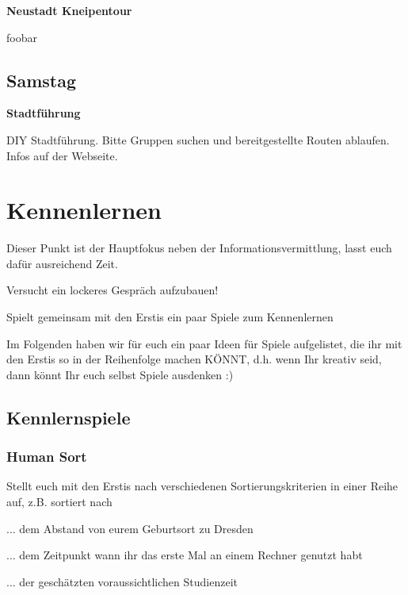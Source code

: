\documentclass[a4paper,12pt]{scrreprt}
\begin{document}
\textbf{Neustadt Kneipentour}
\begin{itemize*}
    \item foobar
\end{itemize*}


\subsection{Samstag}

\textbf{Stadtführung}
\begin{itemize*}
    \item DIY Stadtführung. Bitte Gruppen suchen und bereitgestellte Routen ablaufen. Infos auf der Webseite.
\end{itemize*}


\section{Kennenlernen}
\begin{itemize*}
    \item Dieser Punkt ist der Hauptfokus neben der Informationsvermittlung, lasst euch dafür ausreichend Zeit.
    \item Versucht ein lockeres Gespräch aufzubauen!
    \item Spielt gemeinsam mit den Erstis ein paar Spiele zum Kennenlernen
    \item Im Folgenden haben wir für euch ein paar Ideen für Spiele aufgelistet, die ihr mit den Erstis so in der Reihenfolge machen KÖNNT, d.h. wenn Ihr kreativ seid, dann könnt Ihr euch selbst Spiele ausdenken :)
\end{itemize*}


\subsection{Kennlernspiele}

\subsubsection{Human Sort}
\begin{itemize*}
    \item Stellt euch mit den Erstis nach verschiedenen Sortierungskriterien in einer Reihe auf, z.B. sortiert nach
    \item ... dem Abstand von eurem Geburtsort zu Dresden
    \item ... dem Zeitpunkt wann ihr das erste Mal an einem Rechner genutzt habt
    \item ... der geschätzten voraussichtlichen Studienzeit
\end{itemize*}
\end{document}
